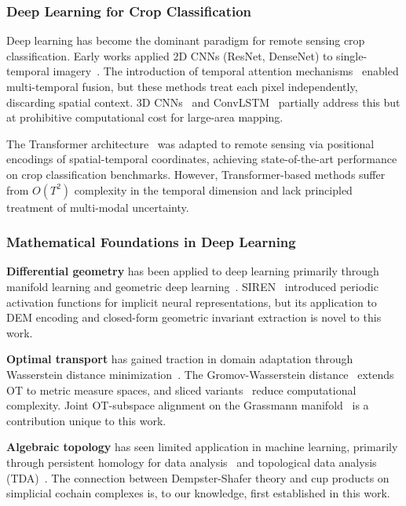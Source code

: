 \subsubsection{Deep Learning for Crop Classification}

Deep learning has become the dominant paradigm for remote sensing crop
classification. Early works applied 2D CNNs (ResNet, DenseNet) to single-temporal
imagery~\cite{zhong2019deep, russwurm2018multi}. The introduction of temporal
attention mechanisms~\cite{russwurm2020breizhcrops, garnot2020satellite} enabled
multi-temporal fusion, but these methods treat each pixel independently,
discarding spatial context. 3D CNNs~\cite{ji2013convolutional} and
ConvLSTM~\cite{shi2015convolutional} partially address this but at prohibitive
computational cost for large-area mapping.

The Transformer architecture~\cite{vaswani2017attention} was adapted to remote
sensing via positional encodings of spatial-temporal coordinates, achieving
state-of-the-art performance on crop classification benchmarks. However,
Transformer-based methods suffer from $O(T^2)$ complexity in the temporal
dimension and lack principled treatment of multi-modal uncertainty.

\subsubsection{Mathematical Foundations in Deep Learning}

\textbf{Differential geometry} has been applied to deep learning primarily
through manifold learning and geometric deep learning~\cite{bronstein2017geometric}.
SIREN~\cite{sitzmann2020siren} introduced periodic activation functions for
implicit neural representations, but its application to DEM encoding and
closed-form geometric invariant extraction is novel to this work.

\textbf{Optimal transport} has gained traction in domain adaptation through
Wasserstein distance minimization~\cite{courty2017optimal}. The Gromov-Wasserstein
distance~\cite{peyre2016gromov} extends OT to metric measure spaces, and sliced
variants~\cite{bonneel2015sliced} reduce computational complexity. Joint
OT-subspace alignment on the Grassmann manifold~\cite{edelman1998geometry} is
a contribution unique to this work.

\textbf{Algebraic topology} has seen limited application in machine learning,
primarily through persistent homology for data analysis~\cite{carlsson2008topology}
and topological data analysis (TDA)~\cite{edelsbrunner2008persistent}. The
connection between Dempster-Shafer theory and cup products on simplicial
cochain complexes is, to our knowledge, first established in this work.

